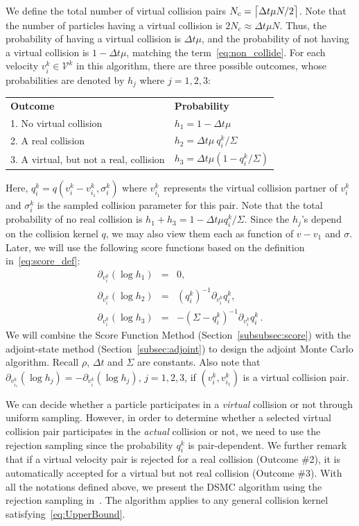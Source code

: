 \documentclass[12pt]{amsart}
\DeclarePairedDelimiter{\ceil}{\lceil}{\rceil}
\newcommand{\cal}{\mathcal}
\begin{document}
We define  the total number of virtual collision pairs $N_c =\ceil[\big]{ \Delta t \mu N/2}$. Note that the number of particles having a virtual collision is $2N_c \approx \Delta t \mu N$. Thus, the probability of having a virtual collision is $\Delta t \mu$, and the probability of not having a virtual collision is $1-\Delta t \mu$,  matching the term~\eqref{eq:non_collide}.  
For each velocity $v_i^k\in {\cal V}^k $ in this algorithm,  there are three possible outcomes, whose probabilities are denoted by $h_j$ where $j=1,2,3$:
\begin{center}
\begin{tabular}{ll}
\textbf{Outcome} &   \textbf{Probability} \\
1. No virtual collision  & $h_1 = 1-\Delta t \mu$  \\
2. A real collision      & $h_2 = \Delta t \mu \  q_i^k /\Sigma  $ \\
3. A virtual, but not a real, collision  &  $h_3 = \Delta t \mu (1- q_i^k /\Sigma)$ \\
\end{tabular}
\end{center}
Here, $q_i^k = q(v_i^k-v_{i_1}^k,\sigma_i^k)$ where $v_{i_1}^k$ represents the virtual collision partner of $v_i^k$ and $\sigma_i^k$ is the sampled collision parameter for this pair. Note that the total probability of no real collision is $h_1+h_3= 1 - \Delta t \mu q_i^k/\Sigma$. Since the $h_j$'s depend on the collision kernel $q$, we may also view them each as function of $v-v_1$ and $\sigma$. Later, we will use the following score functions based on the definition in~\eqref{eq:score_def}:
\begin{eqnarray*}
\partial_{v_i^k} (\log h_1) &=& 0, \nonumber  \\
\partial_{v_i^k} (\log h_2) &=& (q_i^k)^{-1}  \partial_{v_i^k} q_i^k, \\
\partial_{v_i^k} (\log h_3)&=& - (\Sigma -q_i^k)^{-1}  \partial_{v_i^k} q_i^k \,. \nonumber
\end{eqnarray*}
We will combine the Score Function Method (Section~\ref{subsubsec:score}) with the adjoint-state method (Section~\ref{subsec:adjoint}) to design the adjoint Monte Carlo algorithm. Recall $\rho$, $\Delta t$ and $\Sigma$ are constants. Also note that $\partial_{v_{i_1}^k} (\log h_j)= - \partial_{v_{i}^k} (\log h_j)$, $j=1,2,3$, if $(v_{i}^k,v_{i_1}^k)$ is a virtual collision pair.

We can decide whether a particle participates in a \textit{virtual} collision or not through uniform sampling. However, in order to determine whether a selected virtual collision pair participates in the  \textit{actual} collision or not, we need to use the rejection sampling since the probability $q_i^k$ is pair-dependent. We further remark that if a virtual velocity pair is rejected for a real collision (Outcome \#2), it is automatically accepted for a virtual but not real collision (Outcome \#3). With all the notations defined above, we present the DSMC algorithm using the rejection sampling in~. The algorithm applies to any general collision kernel satisfying~\eqref{eq:UpperBound}. 
\end{document}
